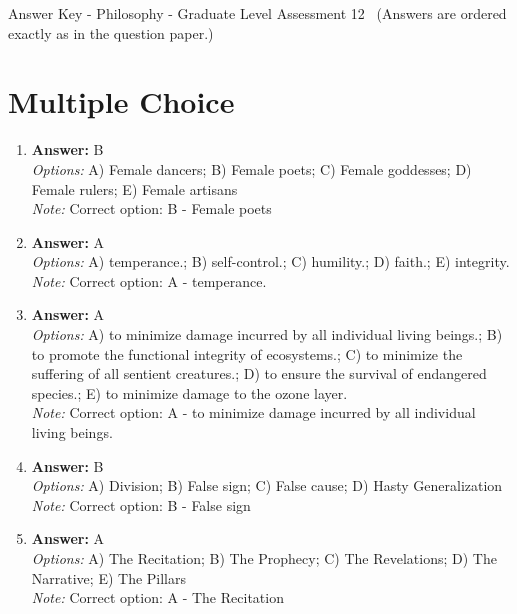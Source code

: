 \documentclass[12pt]{article}
\begin{document}
\begin{center}
Answer Key - Philosophy - Graduate Level Assessment 12 \
\small (Answers are ordered exactly as in the question paper.)
\end{center}

\section*{Multiple Choice}
\begin{enumerate}[label=\arabic*.]
\item \textbf{Answer:} B
\\ \textit{Options:} A) Female dancers; B) Female poets; C) Female goddesses; D) Female rulers; E) Female artisans
\\ \textit{Note:} Correct option: B - Female poets
\item \textbf{Answer:} A
\\ \textit{Options:} A) temperance.; B) self-control.; C) humility.; D) faith.; E) integrity.
\\ \textit{Note:} Correct option: A - temperance.
\item \textbf{Answer:} A
\\ \textit{Options:} A) to minimize damage incurred by all individual living beings.; B) to promote the functional integrity of ecosystems.; C) to minimize the suffering of all sentient creatures.; D) to ensure the survival of endangered species.; E) to minimize damage to the ozone layer.
\\ \textit{Note:} Correct option: A - to minimize damage incurred by all individual living beings.
\item \textbf{Answer:} B
\\ \textit{Options:} A) Division; B) False sign; C) False cause; D) Hasty Generalization
\\ \textit{Note:} Correct option: B - False sign
\item \textbf{Answer:} A
\\ \textit{Options:} A) The Recitation; B) The Prophecy; C) The Revelations; D) The Narrative; E) The Pillars
\\ \textit{Note:} Correct option: A - The Recitation
\end{enumerate}
\end{document}
